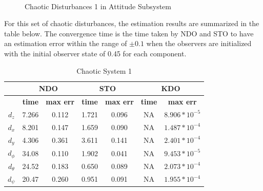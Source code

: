 \documentclass[letterpaper%
, twoside%
, 12pt%
,memoire%
, english%
,creativecommons,hyperref%
]{thETS}
\theoremstyle{newThmStyle}
\begin{document}
\begin{figure}[H]
\centering
{}
\\ \parbox{0.75\textwidth}{\caption{Chaotic Disturbances 1 in Attitude Subsystem}\label{dis_m1_att}}
\end{figure}


For this set of chaotic disturbances, the estimation results are summarized in the table below. The convergence time is the time taken by NDO and STO to have an estimation error within the range of $\pm0.1$ when the observers are initialized with the initial observer state of 0.45 for each component. 



\begin{table}[!htbp]
\centering
\caption{Chaotic System 1}
\begin{tabular}{|c|c|c|c|c|c|c|}
\hline
{}  &  \multicolumn{2}{c|}{\textbf{NDO}} & \multicolumn{2}{c|}{\textbf{STO}} & \multicolumn{2}{c|}{\textbf{KDO}}\\
\hline
{}        &  \textbf{time}  & \textbf{max err}  & \textbf{time}  & \textbf{max err}& \textbf{time}  & \textbf{max err}\\
$d_z$     &  7.266 & 0.112   & 1.721  & 0.096 & NA     & $8.906*10^{-5}$\\
$d_x$     &  8.201 & 0.147   & 1.659  & 0.090 & NA     & $1.487*10^{-4}$\\
$d_y$     &  4.306 & 0.361   & 3.611  & 0.141 & NA     & $2.401*10^{-4}$\\
$d_\phi$  &  34.08 & 0.110   & 1.902  & 0.041 & NA     & $9.453*10^{-5}$\\
$d_\theta$&  24.52 & 0.183   & 0.650  & 0.089 & NA     & $2.073*10^{-4}$\\
$d_\psi$  &  20.47 & 0.260   & 0.951  & 0.091 & NA     & $1.955*10^{-4}$\\

\hline
\end{tabular}
\end{table}
\end{document}
